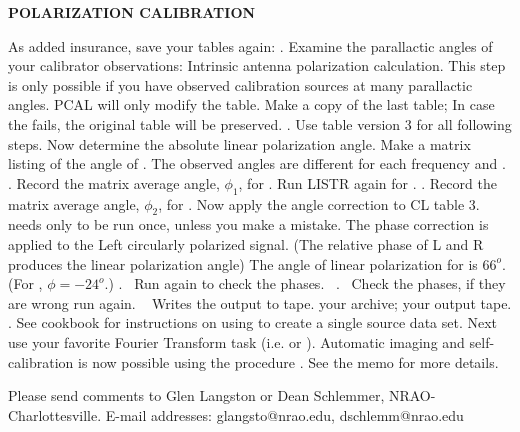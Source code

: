 \clearpage
\centerline{\bf{POLARIZATION CALIBRATION}}
\beddes
{} As added insurance, save your tables again:
.
 Examine the parallactic angles of your calibrator observations:
 Intrinsic antenna polarization calculation.  This step
is only possible if you have observed calibration sources at many
parallactic angles. PCAL will only modify the  table.
 Make a copy of the last  table;
In case the  fails, the original  table will be
preserved. . Use  table version 3 for all following steps.
 Now determine the absolute linear
polarization angle.  Make a matrix listing of the angle of \TCTES.
The observed angles
are different for each frequency and \IF.
.
Record the matrix average angle, $\phi_1$, for .
Run LISTR again for .
.
Record the matrix average angle, $\phi_2$, for .
 Now apply the angle correction to CL table 3.
 needs only to be run once, unless you make a mistake.
The phase correction is applied to the Left circularly polarized
signal.  (The relative phase of L and R produces the
linear polarization angle)
The angle of linear polarization for \TCTES is $66^o$.
(For \TCOTE, $\phi=-24^o$.)
.~
Run  again to check the phases.~
.~
Check the phases, if they are wrong run  again.
~
 Writes the output \uvdata to tape.
 your archive;  your output tape.
.
 See \AIPS cookbook for instructions on
using  to create a single source data set.
Next use your favorite Fourier Transform task
(i.e.  or ).
Automatic imaging and self-calibration is now possible using the \AIPS
procedure . See the \AIPS {} memo for more details.
\eeddes


Please send comments to Glen Langston or Dean Schlemmer, NRAO-Charlottesville.
E-mail addresses: glangsto@nrao.edu, dschlemm@nrao.edu



